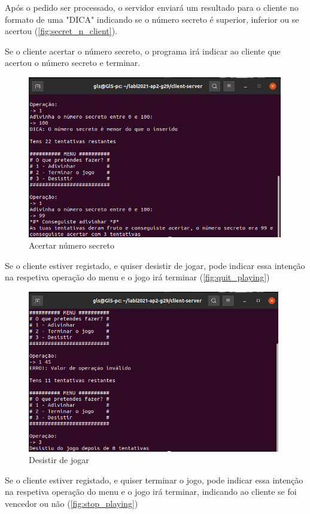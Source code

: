 \documentclass{report}
\begin{document}
Após o pedido ser processado, o servidor enviará um resultado para o cliente no formato de uma "DICA" indicando se o número secreto é superior, inferior ou se acertou (\autoref{fig:secret_n_client}).

Se o cliente acertar o número secreto, o programa irá indicar ao cliente que acertou o número secreto e terminar.

\begin{figure}[!h]
\center 
\includegraphics[height=200pt]{img/fotos_resultado/acertar_num_secret.png}
\caption{Acertar número secreto}
\label{fig:secret_n_acertar}
\end{figure}

Se o cliente estiver registado, e quiser desistir de jogar, pode indicar essa intenção na respetiva operação do menu e o jogo irá terminar (\autoref{fig:quit_playing})

\begin{figure}[!h]
\center 
\includegraphics[height=200pt]{img/fotos_resultado/quit_client.png}
\caption{Desistir de jogar}
\label{fig:quit_playing}
\end{figure}

Se o cliente estiver registado, e quiser terminar o jogo, pode indicar essa intenção na respetiva operação do menu e o jogo irá terminar, indicando ao cliente se foi vencedor ou não (\autoref{fig:stop_playing})
\end{document}
